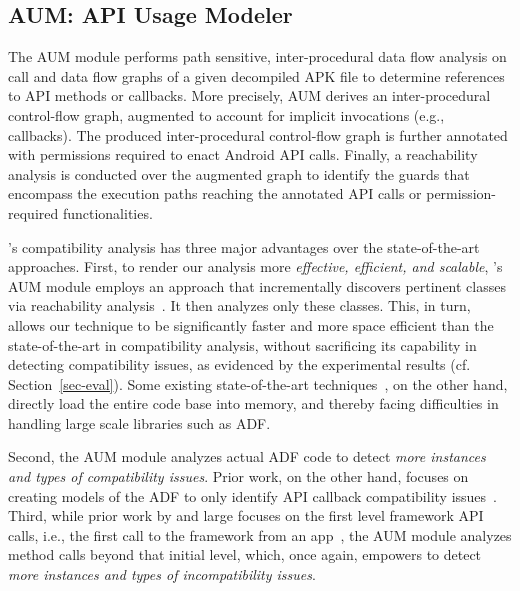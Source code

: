 \subsection{AUM: API Usage Modeler}
\label{API Usage Extraction}

The AUM module performs path sensitive, inter-procedural
data flow analysis on call and data flow graphs of a given
decompiled APK file to determine references to API methods
or callbacks.  More precisely, AUM derives an
inter-procedural control-flow graph, augmented to account
for implicit invocations (e.g., callbacks). The produced inter-procedural
control-flow graph is further annotated with permissions
required to enact Android API calls. Finally, a reachability
analysis is conducted over the augmented graph to identify
the guards that encompass the execution paths reaching the
annotated API calls or permission-required functionalities. 



\@approach's compatibility analysis has three major
advantages over the state-of-the-art approaches.
First,  to render our analysis more \emph{effective,
efficient, and scalable}, \@approach's AUM module
employs an approach that incrementally discovers
pertinent classes via reachability
analysis~\cite{tsutano2017efficient}.  It then analyzes
only these classes. This, in turn, allows our technique
to be significantly faster and more space efficient
than the state-of-the-art in compatibility analysis,
without sacrificing its capability in detecting
compatibility issues, as evidenced by the experimental
results (cf.  Section~\ref{sec-eval}).  Some existing
state-of-the-art
techniques~\cite{huang2018understanding,he2018understanding},
on the other hand, directly load the entire code base
into memory, and thereby facing difficulties in
handling large scale libraries such as ADF. 


Second, the AUM module analyzes actual ADF code to detect
\emph{more instances and types of compatibility issues}.
Prior work, on the other hand, focuses on creating models of
the ADF to only identify API callback compatibility
issues~\cite{huang2018understanding}.  Third, while prior
work by and large focuses on the first level framework API
calls, i.e., the first call to the framework from an
app~\cite{lili2018cid}, the AUM module analyzes method calls
beyond that initial level, which, once again, empowers
\@approach to detect \emph{more instances and types of
incompatibility issues}. 

